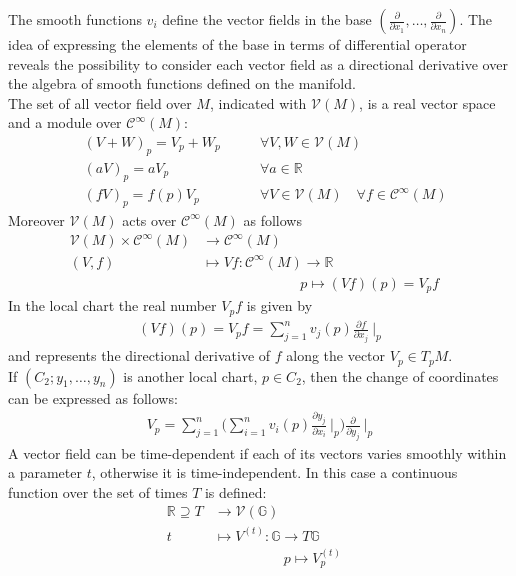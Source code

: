 The smooth functions $v_{i}$ define the vector fields in the base 
$(\frac{\partial}{\partial x_{1}}, \dots ,\frac{\partial}{\partial x_{n}})$. The idea of expressing the elements of the base in terms of differential operator reveals the possibility to consider each vector field as a directional derivative over the algebra of smooth functions defined on the manifold.  \\
The set of all vector field over $M$, indicated with $\mathcal{V}(M)$, is a real vector space and a module over $\mathcal{C}^{\infty}(M)$:
\begin{align*}
&(V+W)_{p} = V_{p} + W_{p}  &\qquad \forall V, W \in \mathcal{V}(M) \\
&(aV)_{p} = aV_{p} &\qquad \forall a \in \mathbb{R} \\
&(fV)_{p} = f(p)V_{p}  &\qquad \forall V \in \mathcal{V}(M) \quad \forall f \in \mathcal{C}^{\infty}(M)
\end{align*}
Moreover $\mathcal{V}(M)$ acts over $\mathcal{C}^{\infty}(M)$ as follows
\begin{align*}
\mathcal{V}(M) \times \mathcal{C}^{\infty}(M) & \longrightarrow  \mathcal{C}^{\infty}(M) &   \\
(V,f) &\longmapsto  Vf  : \mathcal{C}^{\infty}(M)  \longrightarrow   \mathbb{R} \\
& \qquad \qquad \qquad \quad p \longmapsto (Vf)(p) = V_{p}f
\end{align*}
In the local chart the real number $V_{p}f$ is given by
\begin{align*}
(Vf)(p) = V_{p}f =  \sum_{j=1}^{n}v_{j}(p) \frac{\partial f}{\partial x_{j}}~\Bigr|_{p} 
\end{align*}
and represents the directional derivative of $f$ along the vector $V_{p} \in T_{p}M$.\\
If $(C_{2};y_{1}, \dots , y_{n})$ is another local chart, $p \in C_{2}$, then the change of coordinates can be expressed as follows:
\begin{align*}
V_{p} = \sum_{j=1}^{n} \Big( \sum_{i=1}^{n}v_{i}(p) \frac{\partial y_{j}}{\partial x_{i}}~\Bigr|_{p}  \Big) \frac{\partial }{\partial y_{j}}~\Bigr|_{p}
\end{align*}
A vector field can be time-dependent if each of its vectors varies smoothly within a parameter $t$, otherwise it is time-independent. In this case a continuous function over the set of times $T$ is defined:
\begin{align*}
\mathbb{R} \supseteq T & \longrightarrow  \mathcal{V}(\mathbb{G}) &   \\
t &\longmapsto  V^{(t)}  : \mathbb{G}  \longrightarrow   T\mathbb{G}\\
&  \qquad \qquad \quad p \longmapsto V^{(t)}_{p}
\end{align*}
